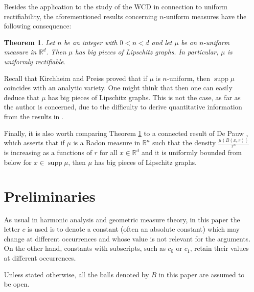 \documentclass[11pt]{amsart}
\newcommand{\R}{{\mathbb R}}       %
\newcommand{\supp}{\operatorname{supp}}
\newcommand{\vv}{{\vspace{2mm}}}
\newcommand{\vvv}{\vspace{4mm}}
\newtheorem{theorem}{Theorem}[section]
\theoremstyle{definition}
\theoremstyle{remark}
\numberwithin{equation}{section}
\begin{document}
Besides the application to the study of the WCD in connection to uniform rectifiability,
the aforementioned results concerning $n$-uniform measures have the following consequence: 


\begin{theorem}\label{teounifmeu}
Let $n$ be an integer with $0<n<d$ and let $\mu$ be an $n$-uniform measure in $\R^d$. Then $\mu$ has big pieces of Lipschitz graphs.
In particular, $\mu$ is uniformly rectifiable.
\end{theorem}

Recall that Kirchheim and Preiss \cite{KiP} proved that if $\mu$ is $n$-uniform, then $\supp\mu$
coincides with an analytic variety. 
One might think that then one can easily deduce that $\mu$ has big pieces of Lipschitz graphs.
This is not the case, as far as the author is concerned, due to the difficulty to derive 
quantitative information from the results in \cite{KiP}.

Finally, it is also worth comparing Theorem \ref{teounifmeu} to a connected result of
De Pauw \cite{DeP}, which asserts that if $\mu$ is a Radon measure in $\R^n$ such that the density $\frac{\mu(B(x,r))}{r^n}$ is increasing as a functions of $r$ for all $x\in\R^d$ and it is uniformly bounded
from below for $x\in\supp\mu$, then $\mu$ has big pieces of Lipschitz graphs.



\vvv



\section{Preliminaries}

As usual in harmonic analysis and geometric measure theory, in this paper 
the letter $c$ is used is to denote
a constant (often an absolute constant) which may change at different occurrences and whose
value is not relevant for the arguments. On the other hand, constants with subscripts, such as
$c_0$ or $c_1$, retain their values at different occurrences.

Unless stated otherwise, all the balls denoted by $B$ in this paper are assumed to be open.


\vv
\end{document}

